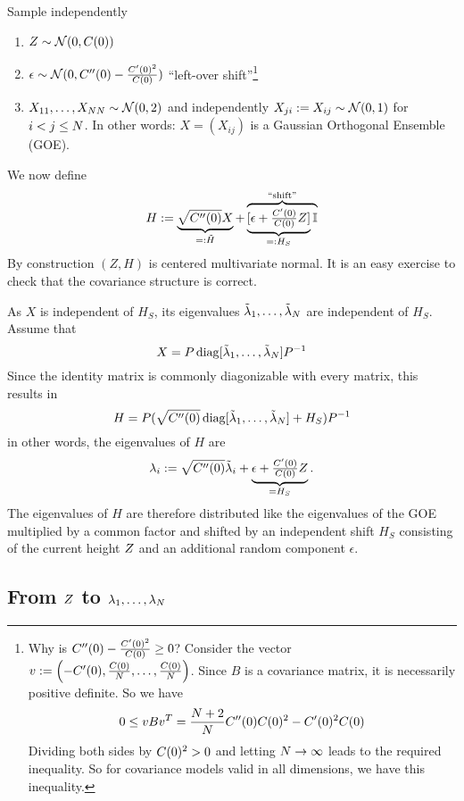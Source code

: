 Sample independently
\begin{enumerate}
	\item \(Z\sim\mathcal{N}(0, C(0))\)
	\item \(\epsilon \sim \mathcal{N}(0, C''(0) - \frac{C'(0)^2}{C(0)})\)
	``left-over shift''\footnote{
		Why is \(C''(0) - \frac{C'(0)^2}{C(0)} \ge 0\)? Consider the
		vector \(v:=\left(-C'(0), \frac{C(0)}{N}, \dots,
		\frac{C(0)}{N}\right)\).  Since \(B\) is a covariance matrix, it
		is necessarily positive definite.
		So we have
		\[
			0 \le v B v^T
			= \frac{N+2}{N}C''(0)C(0)^2 - C'(0)^2C(0)
		\]
		Dividing both sides by \(C(0)^2 > 0\) and letting \(N\to\infty\)
		leads to the required inequality. So for covariance models valid in all
		dimensions, we have this inequality.
	}
	\item \(X_{11},\dots,X_{NN}\sim\mathcal{N}(0, 2)\) and
	independently \(X_{ji}:=X_{ij}\sim\mathcal{N}(0,1)\) for \(i<j\le N\).
	In other words: \(X = (X_{ij})\) is a Gaussian Orthogonal Ensemble (GOE).
\end{enumerate}
We now define
\[
	H := \underbrace{\sqrt{C''(0)}X}_{=:\tilde{H}}
	+ \overbrace{\underbrace{[\epsilon + \tfrac{C'(0)}{C(0)} Z]}_{=:H_S}\mathbb{I}}^{\text{``shift''}}
\]
By construction \((Z,H)\) is centered multivariate normal. It is an easy
exercise to check that the covariance structure is correct.

As \(X\) is independent of \(H_S\), its eigenvalues
\(\tilde{\lambda}_1,\dots,\tilde{\lambda}_N\) are independent of
\(H_S\). Assume that
\[
	X = P\operatorname{diag}[\tilde{\lambda}_1,\dots,\tilde{\lambda}_N]P^{-1}
\]
Since the identity matrix is commonly diagonizable with every matrix, this
results in
\[
	H = P(\sqrt{C''(0)} \operatorname{diag}[\tilde{\lambda}_1,\dots,\tilde{\lambda}_N] + H_S) P^{-1}
\]
in other words, the eigenvalues of \(H\) are
\[
	\lambda_i
	:= \sqrt{C''(0)}\tilde{\lambda}_i + \underbrace{\epsilon + \tfrac{C'(0)}{C(0)}Z}_{=H_S}.
\]
The eigenvalues of \(H\) are therefore distributed like the eigenvalues of the
GOE multiplied by a common factor and shifted by an independent shift \(H_S\)
consisting of the current height \(Z\) and an additional random component
\(\epsilon\).

\subsection{\texorpdfstring{From \(Z\) to \(\lambda_1,\dots,\lambda_N\)}{From Z to λ1,...,λN}}
\label{subsec: from rf to lambda}

